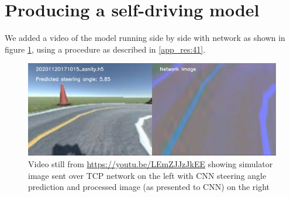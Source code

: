 
\section{Producing a self-driving model}

We added a video of the model running side by side with network as shown in figure 
\ref{fig:20201120171015_sanity_sim_network}, using a procedure as described in \ref{app_res:41}.

\begin{figure}[ht]
 \centering 
 \includegraphics[width=\textwidth]{Figures/20201120171015_sanity_sim_network.png}
 \caption{Video still from \href{https://youtu.be/LEmZJJzJkEE}{https://youtu.be/LEmZJJzJkEE} showing simulator image sent over TCP network on the left with CNN steering angle prediction and processed image (as presented to CNN) on the right}
 \label{fig:20201120171015_sanity_sim_network} 
\end{figure}

